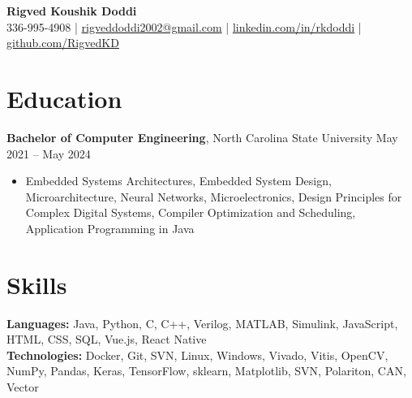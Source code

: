 \documentclass[letterpaper,9pt]{article}
\begin{document}
\begin{center}
    {\Large \textbf{Rigved Koushik Doddi}}\\
    \vspace{1pt}
    \small 336-995-4908 | \href{mailto:rigveddoddi2002@gmail.com}{rigveddoddi2002@gmail.com} | \href{https://www.linkedin.com/in/rkdoddi/}{linkedin.com/in/rkdoddi} | \href{https://github.com/RigvedKD}{github.com/RigvedKD}\\
\end{center}

\section*{Education}
\noindent \textbf{Bachelor of Computer Engineering}, North Carolina State University \hfill May 2021 – May 2024
\begin{itemize}[leftmargin=*,itemsep=0pt,topsep=0pt]
    \item Embedded Systems Architectures, Embedded System Design, Microarchitecture, Neural Networks, Microelectronics, Design Principles for Complex Digital Systems, Compiler Optimization and Scheduling, Application Programming in Java
\end{itemize}

\section*{Skills}
\noindent \textbf{Languages:} Java, Python, C, C++, Verilog, MATLAB, Simulink, JavaScript, HTML, CSS, SQL, Vue.js, React Native \\
\noindent \textbf{Technologies:} Docker, Git, SVN, Linux, Windows, Vivado, Vitis, OpenCV, NumPy, Pandas, Keras, TensorFlow, sklearn, Matplotlib, SVN, Polariton, CAN, Vector

\end{document}
